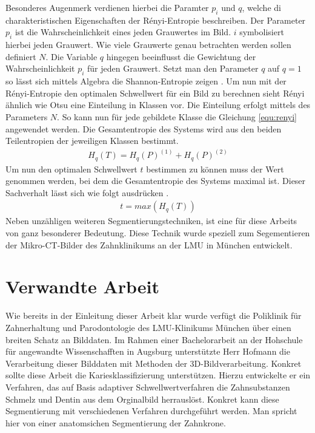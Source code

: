 Besonderes Augenmerk verdienen hierbei die Paramter $p_{i}$ und $q$, welche di
charakteristischen Eigenschaften der Rényi-Entropie beschreiben. Der Parameter $p
_{i}$ ist die Wahrscheinlichkeit eines jeden Grauwertes im Bild. $i$
symbolisiert hierbei jeden Grauwert. Wie viele Grauwerte genau betrachten werden
sollen definiert $N$. Die Variable $q$ hingegen beeinflusst die Gewichtung der
Wahrscheinlichkeit $p_{i}$ für jeden Grauwert. Setzt man den Parameter $q$ auf $q
= 1$ so lässt sich mittels Algebra die Shannon-Entropie zeigen \citep[vgl.][K.~2]{bromiley2004}.
Um nun mit der Rényi-Entropie den optimalen Schwellwert für ein Bild zu berechnen
sieht Rényi ähnlich wie Otsu eine Einteilung in Klassen vor. Die Einteilung
erfolgt mittels des Parameters $N$. So kann nun für jede gebildete Klasse die Gleichung
\ref{equ:renyi} angewendet werden. Die Gesamtentropie des Systems wird aus den
beiden Teilentropien der jeweiligen Klassen bestimmt\citep[vgl.][K.~2]{bromiley2004}.
\begin{align}
	H_{q}(T) = H_{q}(P)^{(1)}+ H_{q}(P)^{(2)}
\end{align}
Um nun den optimalen Schwellwert $t$ bestimmen zu können muss der Wert genommen werden,
bei dem die Gesamtentropie des Systems maximal ist. Dieser Sachverhalt lässt sich
wie folgt ausdrücken \citep[vgl.][K.~2]{bromiley2004}.
\begin{align}
	t = max(H_{q}(T))
\end{align}
Neben unzähligen weiteren Segmentierungstechniken, ist eine für diese Arbeits
von ganz besonderer Bedeutung. Diese Technik wurde speziell zum Segementieren der
Mikro-\ac{CT}-Bilder des Zahnklinikums an der \ac{LMU} in München entwickelt.

\pagebreak

\section{Verwandte Arbeit}
\label{sec:verwwandte_arbeit} Wie bereits in der Einleitung dieser Arbeit klar
wurde verfügt die Poliklinik für Zahnerhaltung und Parodontologie des \ac{LMU}-Klinikums
München über einen breiten Schatz an Bilddaten. Im Rahmen einer Bachelorarbeit
an der Hohschule für angewandte Wissenschafften in Augsburg unterstützte Herr
Hofmann die Verarbeitung dieser Bilddaten mit Methoden der 3D-Bildverarbeitung. Konkret
sollte diese Arbeit die Kariesklassifizierung unterstützen. Hierzu entwickelte
er ein Verfahren, das auf Basis adaptiver Schwellwertverfahren die Zahnsubstanzen
Schmelz und Dentin aus dem Orginalbild herrauslöst. Konkret kann diese
Segmentierung mit verschiedenen Verfahren durchgeführt werden. Man spricht hier von
einer anatomsichen Segmentierung der Zahnkrone.

